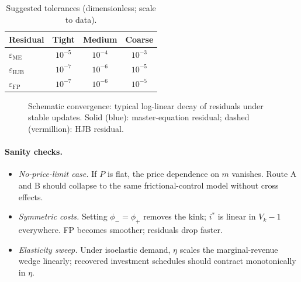\documentclass[11pt,letterpaper,oneside]{article}
\numberwithin{equation}{section}
\newcommand{\1}{\mathbf{1}}
\begin{document}
\begin{table}[ht]
\centering
\small
\begin{tabular}{@{}lccc@{}}
\toprule
Residual & Tight & Medium & Coarse \\
\midrule
$\varepsilon_{\mathrm{ME}}$ & $10^{-5}$ & $10^{-4}$ & $10^{-3}$ \\
$\varepsilon_{\mathrm{HJB}}$ & $10^{-7}$ & $10^{-6}$ & $10^{-5}$ \\
$\varepsilon_{\mathrm{FP}}$  & $10^{-7}$ & $10^{-6}$ & $10^{-5}$ \\
\bottomrule
\end{tabular}
\caption{Suggested tolerances (dimensionless; scale to data).}
\end{table}

\begin{figure}[ht]
\centering
{}
\caption{Schematic convergence: typical log-linear decay of residuals under stable updates. Solid (blue): master-equation residual; dashed (vermillion): HJB residual.}
\end{figure}

\paragraph{Sanity checks.}
\begin{itemize}[leftmargin=1.25em]
\item \emph{No-price-limit case.} If $P$ is flat, the price dependence on $m$ vanishes. Route A and B should collapse to the same frictional-control model without cross effects.
\item \emph{Symmetric costs.} Setting $\phi_-=\phi_+$ removes the kink; $i^*$ is linear in $V_k-1$ everywhere. FP becomes smoother; residuals drop faster.
\item \emph{Elasticity sweep.} Under isoelastic demand, $\eta$ scales the marginal-revenue wedge linearly; recovered investment schedules should contract monotonically in $\eta$.
\end{itemize}
\end{document}
